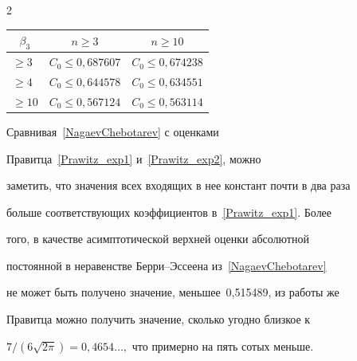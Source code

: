 \begin{multicols}{2}
{\begin{center}
\begin{tabular}{|l|c|c|}
\hline


\multicolumn{1}{|c|}{$\beta_3$}  & $n\ge3$ & $n\ge10$ \\


  \hline


$\ge3 $&$ C_0\le0{,}687607$ &$ C_0\le0{,}674238$ \\




$\ge4 $& $C_0\le0{,}644578 $& $C_0\le0{,}634551 $\\




 $\ge10$ & $C_0\le0{,}567124$ & $C_0\le0{,}563114$ \\


  \hline


\end{tabular}


\end{center}




}




\vspace*{6pt}








\bigskip


\addtocounter{table}{1}





Сравнивая~\eqref{NagaevChebotarev} с оценками


Правитца~\eqref{Prawitz_exp1} и~\eqref{Prawitz_exp2}, можно


заметить, что значения всех входящих в нее констант почти в два раза


больше со\-от\-вет\-ст\-ву\-ющих коэффициентов в~\eqref{Prawitz_exp1}. Более


того, в качестве асимптотической верхней оценки абсолютной


постоянной в неравенстве Берри--Эссеена из~\eqref{NagaevChebotarev}


не может быть получено значение, меньшее~0,515489, из работы же


Правитца можно получить значение, сколько угодно близкое к


$7/(6\sqrt{2\pi})=0{,}4654\ldots,$ что примерно на пять сотых меньше.








\end{multicols}
